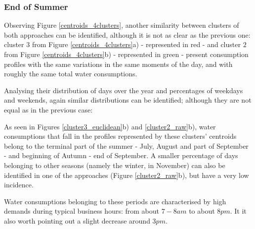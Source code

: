 \documentclass[9pt,journal,compsoc]{IEEEtran}
\begin{document}
\subsubsection{End of Summer}

Observing Figure \ref{centroids_4clusters}, another similarity between clusters of both approaches can be identified, although it is not as clear as the previous one: cluster $3$ from Figure \ref{centroids_4clusters}a) - represented in red - and cluster $2$ from Figure \ref{centroids_4clusters}b) - represented in green - present consumption profiles with the same variations in the same moments of the day, and with roughly the same total water consumptions.

Analysing their distribution of days over the year and percentages of weekdays and weekends, again similar distributions can be identified; although they are not equal as in the previous case:

As seen in Figures \ref{cluster3_euclidean}b) and \ref{cluster2_raw}b), water consumptions that fall in the profiles represented by these clusters' centroids belong to the terminal part of the summer - July, August and part of September - and beginning of Autumn - end of September. A smaller percentage of days belonging to other seasons (namely the winter, in November) can also be identified in one of the approaches (Figure \ref{cluster2_raw}b), but have a very low incidence.

Water consumptions belonging to these periods are characterised by high demands during typical business hours: from about $7-8am$ to about $8pm$. It it also worth pointing out a slight decrease around $3pm$.
\end{document}
